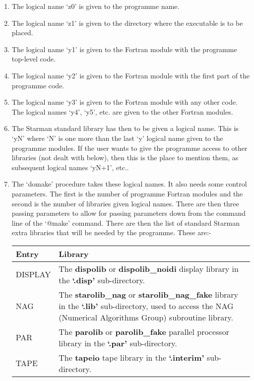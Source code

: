 \begin{enumerate}
\item The logical name `z0' is given to the programme name.
\item The logical name `z1' is given to the directory where the executable
      is to be placed.
\item The logical name `y1' is given to the Fortran module with the programme 
      top-level code.
\item The logical name `y2' is given to the Fortran module with the first part 
      of the programme code.
\item The logical name `y3' is given to the Fortran module with any other 
      code. The logical names `y4', `y5', etc. are given to the other 
      Fortran modules.
\item The Starman standard library has then to be given a logical name. 
      This is `yN' where `N' is one more than the last `y' logical name 
      given to the programme modules. If the user wants to give the 
      programme access to other libraries (not dealt with below), then this
      is the place to mention them, as subsequent logical names `yN+1', 
      etc..
\item The `domake' procedure takes these logical names. It also needs some
      control parameters. The first is the number of programme Fortran 
      modules and the second is the number of libraries given logical 
      names. There are then three passing parameters to allow for
      passing parameters down from the command line of the `@make'
      command. There are then the list of standard Starman extra
      libraries that will be needed by the programme. These are:-

      \begin{tabular}{|l|p{3in}|}\hline
       Entry & Library \\ \hline
       DISPLAY & The {\bf dispolib} or {\bf dispolib\_noidi} display library 
                 in the {\bf `.disp'} sub-directory. \\
       NAG     & The {\bf starolib\_nag} or {\bf starolib\_nag\_fake} library
                 in the {\bf `.lib'} sub-directory, used to access the NAG
                 (Numerical Algorithms Group) subroutine library. \\
       PAR     & The {\bf parolib} or {\bf parolib\_fake} parallel processor library 
                 in the {\bf `.par'} sub-directory. \\
       TAPE    & The {\bf tapeio} tape library in the {\bf `.interim'} 
                 sub-directory. \\ \hline
       \end{tabular}


\end{enumerate}
